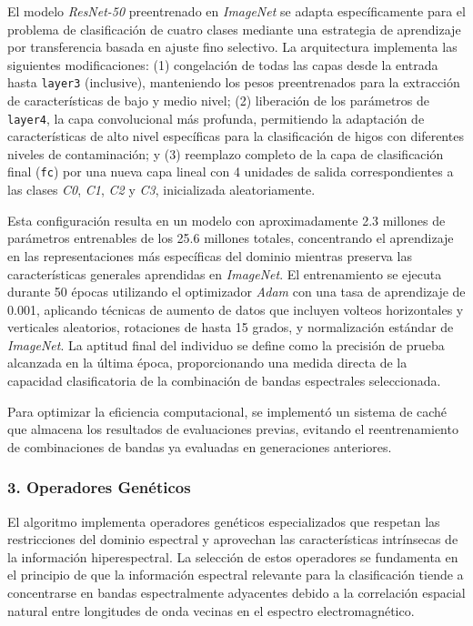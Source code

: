 El modelo \emph{ResNet-50} preentrenado en \emph{ImageNet} se adapta específicamente para el problema de clasificación de cuatro clases mediante una estrategia de aprendizaje por transferencia basada en ajuste fino selectivo. La arquitectura implementa las siguientes modificaciones: (1) congelación de todas las capas desde la entrada hasta \texttt{layer3} (inclusive), manteniendo los pesos preentrenados para la extracción de características de bajo y medio nivel; (2) liberación de los parámetros de \texttt{layer4}, la capa convolucional más profunda, permitiendo la adaptación de características de alto nivel específicas para la clasificación de higos con diferentes niveles de contaminación; y (3) reemplazo completo de la capa de clasificación final (\texttt{fc}) por una nueva capa lineal con 4 unidades de salida correspondientes a las clases \emph{C0}, \emph{C1}, \emph{C2} y \emph{C3}, inicializada aleatoriamente.

\vspace{5mm}

Esta configuración resulta en un modelo con aproximadamente 2.3 millones de parámetros entrenables de los 25.6 millones totales, concentrando el aprendizaje en las representaciones más específicas del dominio mientras preserva las características generales aprendidas en \emph{ImageNet}. El entrenamiento se ejecuta durante 50 épocas utilizando el optimizador \emph{Adam} con una tasa de aprendizaje de 0.001, aplicando técnicas de aumento de datos que incluyen volteos horizontales y verticales aleatorios, rotaciones de hasta 15 grados, y normalización estándar de \emph{ImageNet}. La aptitud final del individuo se define como la precisión de prueba alcanzada en la última época, proporcionando una medida directa de la capacidad clasificatoria de la combinación de bandas espectrales seleccionada.

\vspace{5mm}

Para optimizar la eficiencia computacional, se implementó un sistema de caché que almacena los resultados de evaluaciones previas, evitando el reentrenamiento de combinaciones de bandas ya evaluadas en generaciones anteriores.

\subsubsection{3. Operadores Genéticos}

El algoritmo implementa operadores genéticos especializados que respetan las restricciones del dominio espectral y aprovechan las características intrínsecas de la información hiperespectral. La selección de estos operadores se fundamenta en el principio de que la información espectral relevante para la clasificación tiende a concentrarse en bandas espectralmente adyacentes debido a la correlación espacial natural entre longitudes de onda vecinas en el espectro electromagnético.

